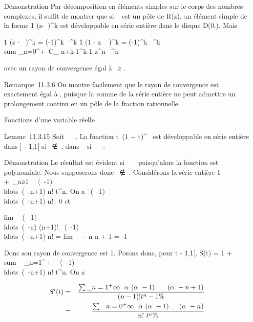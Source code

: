 \documentclass[]{article}
\begin{document}
Démonstration Par décomposition en éléments simples sur le corps des
nombres complexes, il suffit de montrer que si \alpha~ est un pôle de R(z), un
élément simple de la forme  1 \over
(z-\alpha~)^k est développable en série entière dans le disque
D(0,\rho). Mais

 1 \over (z - \alpha~)^k = (-1)^k
\over \alpha~^k  1 \over (1 -
z \over \alpha~ )^k = (-1)^k
\over \alpha~^k  \\sum
\_n=0^+\infty~C\_ n+k-1^k-1 z^n
\over \alpha~^n

avec un rayon de convergence égal à \textbar{}\alpha~\textbar{}≥ \rho.

Remarque~11.3.6 On montre facilement que le rayon de convergence est
exactement égal à \rho, puisque la somme de la série entière ne peut
admettre un prolongement continu en un pôle de la fraction rationnelle.

Fonctions d'une variable réelle

Lemme~11.3.15 Soit \alpha~ \in {}~. La fonction t\mapsto~(1
+ t)^\alpha~ est développable en série entière dans {]} - 1,1{[} si
\alpha~∉~, dans ~ si \alpha~ \in {}~.

Démonstration Le résultat est évident si \alpha~ \in {}~ puisqu'alors la fonction
est polynomiale. Nous supposerons donc \alpha~∉~.
Considérons la série entière 1 +\
\sum  \_n≥1~
\alpha~(\alpha~-1)\\ldots~(\alpha~-n+1)
\over n! t^n. On a 
\alpha~(\alpha~-1)\\ldots~(\alpha~-n+1)
\over n! \neq~0 et

lim~ 
\alpha~(\alpha~-1)\\ldots~(\alpha~-n)
\over (n+1)! \over 
\alpha~(\alpha~-1)\\ldots~(\alpha~-n+1)
\over n!  = lim~ \alpha~ - n
\over n + 1 = -1

Donc son rayon de convergence est 1. Posons donc, pour t \in{]} - 1,1{[},
S(t) = 1 + \\sum ~
\_n=1^+\infty~
\alpha~(\alpha~-1)\\ldots~(\alpha~-n+1)
\over n! t^n. On a

\begin{align*} S'(t)& =&
\sum \_n=1^+\infty~~ \alpha~(\alpha~ -
1)\ldots~(\alpha~ - n + 1) \over (n
- 1)! t^n-1\%& \\ & =&
\sum \_n=0^+\infty~~ \alpha~(\alpha~ -
1)\ldots(\alpha~ - n) \over n!~
t^n \%& \\
\end{align*}
\end{document}

